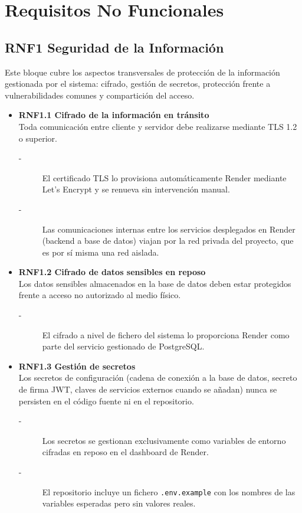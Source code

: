\section{Requisitos No Funcionales}

\subsection{RNF1 Seguridad de la Información}
Este bloque cubre los aspectos transversales de protección de la
información gestionada por el sistema: cifrado, gestión de secretos,
protección frente a vulnerabilidades comunes y compartición del
acceso.
\begin{itemize}
    \item \textbf{RNF1.1 Cifrado de la información en tránsito} \\
    Toda comunicación entre cliente y servidor debe realizarse mediante TLS 1.2 o superior.
    \begin{description}
        \item[-] El certificado TLS lo provisiona automáticamente Render mediante Let's Encrypt y se renueva sin intervención manual.
        \item[-] Las comunicaciones internas entre los servicios desplegados en
        Render (backend a base de datos) viajan por la red privada del
        proyecto, que es por sí misma una red aislada.  
    \end{description}


    \item \textbf{RNF1.2 Cifrado de datos sensibles en reposo} \\
    Los datos sensibles almacenados en la base de datos deben estar
    protegidos frente a acceso no autorizado al medio físico.
    \begin{description}
        \item[-] El cifrado a nivel de fichero del sistema lo proporciona Render
        como parte del servicio gestionado de PostgreSQL.\@
    \end{description}


    \item \textbf{RNF1.3 Gestión de secretos} \\
    Los secretos de configuración (cadena de conexión a la base de datos,
    secreto de firma JWT, claves de servicios externos cuando se añadan)
    nunca se persisten en el código fuente ni en el repositorio.
    \begin{description}
        \item[-] Los secretos se gestionan exclusivamente como variables de entorno
        cifradas en reposo en el dashboard de Render.
        \item[-] El repositorio incluye un fichero \texttt{.env.example} con los nombres de
        las variables esperadas pero sin valores reales.
    \end{description}



\end{itemize}
